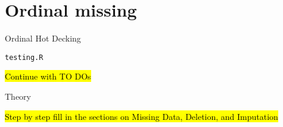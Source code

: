 \section*{Ordinal missing}
	\begin{coi}
		\item Ordinal Hot Decking
			\begin{coi}
				\item \texttt{testing.R}
					\begin{coi}
						\item \hl{Continue with TO DOs}			
					\end{coi}
			\end{coi}
		\item Theory
			\begin{coi}
				\item \hl{Step by step fill in the sections on Missing Data, Deletion, and Imputation}
			\end{coi}
	\end{coi}


	


	




